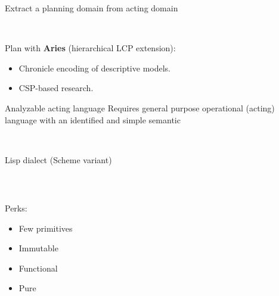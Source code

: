 \begin{frame}{Extract a planning domain from acting domain}
    \centering

    ~

    Plan with \textbf{Aries} (hierarchical LCP extension):
    \begin{itemize}
        \item Chronicle encoding of descriptive models.
        \item CSP-based research. 
    \end{itemize}

\end{frame}

\begin{frame}{Analyzable acting language}
    Requires general purpose operational (acting) language with an identified and simple semantic

    ~

    \begin{center}
        Lisp dialect (Scheme variant)
    \end{center}
    
    ~

    \begin{columns}
        \begin{column}{0.45\textwidth}
            Perks:
            \begin{itemize}
                \item Few primitives
                \item Immutable
                \item Functional
                \item Pure
            \end{itemize}
        \end{column}
    \end{columns} 
\end{frame}

